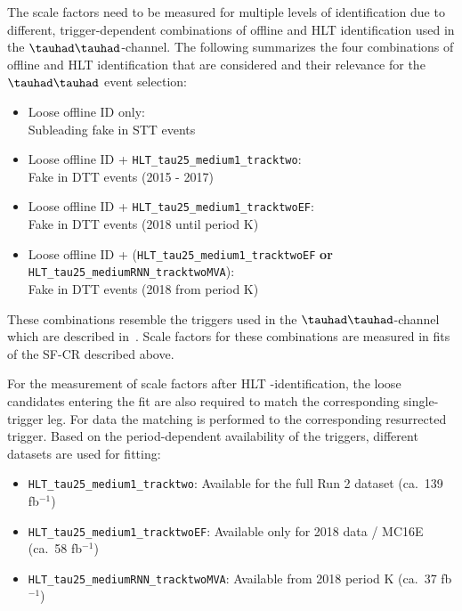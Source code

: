 The scale factors need to be measured for multiple levels of \tauhad
identification due to different, trigger-dependent combinations of
offline and HLT \tauhad identification used in the
$\tauhad\tauhad$-channel. The following summarizes the four
combinations of offline and HLT \tauhad identification that are
considered and their relevance for the $\tauhad\tauhad$ event
selection:
\begin{itemize}
\item Loose offline \tauhad ID only:\\
  Subleading fake \tauhad in STT events
\item Loose offline \tauhad ID + \verb|HLT_tau25_medium1_tracktwo|:\\
  Fake \tauhad in DTT events (2015 - 2017)
\item Loose offline \tauhad ID + \verb|HLT_tau25_medium1_tracktwoEF|:\\
  Fake \tauhad in DTT events (2018 until period K)
\item Loose offline \tauhad ID + (\verb|HLT_tau25_medium1_tracktwoEF|
  \textbf{or} \verb|HLT_tau25_mediumRNN_tracktwoMVA|):\\
  Fake \tauhad in DTT events (2018 from period K)
\end{itemize}
These combinations resemble the triggers used in the
$\tauhad\tauhad$-channel which are described
in~. Scale factors for these
combinations are measured in fits of the SF-CR described above.

For the measurement of scale factors after HLT \tauhad-identification,
the loose \tauhad candidates entering the fit are also required to
match the corresponding single-\tauhad trigger leg. For data the
matching is performed to the corresponding resurrected trigger. Based
on the period-dependent availability of the triggers, different
datasets are used for fitting:
\begin{itemize}
\item \verb|HLT_tau25_medium1_tracktwo|: Available for the full Run 2
  dataset (ca.\ 139 fb$^{-1}$)
\item \verb|HLT_tau25_medium1_tracktwoEF|: Available only for 2018 data /
  MC16E (ca.\ 58 fb$^{-1}$)
\item \verb|HLT_tau25_mediumRNN_tracktwoMVA|: Available from 2018 period K (ca.\ 37 fb$^{-1}$)
\end{itemize}

